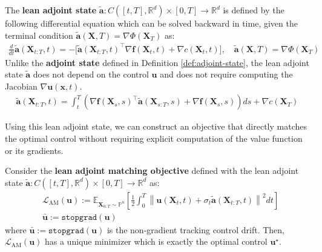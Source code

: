 \documentclass{article}
\begin{document}
\begin{definition}\label{def:lean-adjoint-state}
    The \textbf{lean adjoint state} $\tilde{\boldsymbol{a}}:C([t,T], \mathbb{R}^d)\times[0,T]\to \mathbb{R}^d$ is defined by the following differential equation which can be solved backward in time, given the terminal condition $\tilde{\boldsymbol{a}}(\boldsymbol{X},T)=\nabla \Phi(\boldsymbol{X}_T)$ as: 
    \begin{align}
        \frac{d}{dt}\tilde{\boldsymbol{a}}(\boldsymbol{X}_{t:T},t)=-\big[\tilde{\boldsymbol{a}}(\boldsymbol{X}_{t:T}, t)^\top\nabla \boldsymbol{f}(\boldsymbol{X}_t,t)+\nabla c(\boldsymbol{X}_t,t)\big], \quad \tilde{\boldsymbol{a}}(\boldsymbol{X},T)=\nabla \Phi(\boldsymbol{X}_T)\label{eq:lean-adjoint-bwd-derivative}
    \end{align}
    Unlike the \textbf{adjoint state} defined in Definition \ref{def:adjoint-state}, the lean adjoint state $\tilde{\boldsymbol{a}}$ does not depend on the control $\boldsymbol{u}$ and does not require computing the Jacobian $\nabla \boldsymbol{u}(\boldsymbol{x},t)$. 
    \begin{align}
        \tilde{\boldsymbol{a}}(\boldsymbol{X}_{t:T}, t)=\int_t^T\left(\nabla \boldsymbol{f}(\boldsymbol{X}_s,s)^\top\tilde{\boldsymbol{a}}(\boldsymbol{X}_{s:T},s)+\nabla \boldsymbol{f}(\boldsymbol{X}_s,s)\right)ds+\nabla c(\boldsymbol{X}_T)\label{eq:lean-adjoint-state}
    \end{align}
\end{definition}
Using this lean adjoint state, we can construct an objective that directly matches the optimal control without requiring explicit computation of the value function or its gradients.

\begin{proposition}\label{prop:lean-adjoint-loss}
    Consider the \textbf{lean adjoint matching objective} defined with the lean adjoint state $\tilde{\boldsymbol{a}}:C([t,T], \mathbb{R}^d)\times[0,T]\to \mathbb{R}^d$ as:
    \begin{align}
        &\mathcal{L}_{\text{AM}}(\boldsymbol{u}):=\mathbb{E}_{\boldsymbol{X}_{0:T}\sim \mathbb{P}^{\bar{u}}}\left[\frac{1}{2}\int_0^T\left\|\boldsymbol{u}(\boldsymbol{X}_t,t)+\sigma_t\tilde{\boldsymbol{a}}(\boldsymbol{X}_{t:T},t)\right\|^2dt\right]\tag{Lean AM Objective}\label{eq:lean-adjoint-loss}\\
        &\bar{\boldsymbol{u}}:=\texttt{stopgrad}(\boldsymbol{u})\nonumber
    \end{align}
    where $\bar{\boldsymbol{u}}:=\texttt{stopgrad}(\boldsymbol{u})$ is the non-gradient tracking control drift. Then, $\mathcal{L}_{\text{AM}}(\boldsymbol{u})$ has a unique minimizer which is exactly the optimal control $\boldsymbol{u}^\star$.
\end{proposition}
\end{document}
